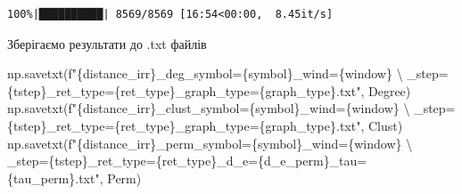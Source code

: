 \documentclass[
  letterpaper,
]{report}
\newenvironment{Shaded}{\begin{snugshade}}{\end{snugshade}}
\newcommand{\CharTok}[1]{\textcolor[rgb]{0.13,0.47,0.30}{#1}}
\newcommand{\NormalTok}[1]{\textcolor[rgb]{0.00,0.23,0.31}{#1}}
\newcommand{\SpecialCharTok}[1]{\textcolor[rgb]{0.37,0.37,0.37}{#1}}
\newcommand{\SpecialStringTok}[1]{\textcolor[rgb]{0.13,0.47,0.30}{#1}}
\begin{document}
\begin{verbatim}
100%|██████████| 8569/8569 [16:54<00:00,  8.45it/s]
\end{verbatim}

Зберігаємо результати до .txt файлів

\begin{Shaded}
\begin{Highlighting}[]
\NormalTok{np.savetxt(}\SpecialStringTok{f"}\SpecialCharTok{\{}\NormalTok{distance\_irr}\SpecialCharTok{\}}\SpecialStringTok{\_deg\_symbol=}\SpecialCharTok{\{}\NormalTok{symbol}\SpecialCharTok{\}}\SpecialStringTok{\_wind=}\SpecialCharTok{\{}\NormalTok{window}\SpecialCharTok{\}}\SpecialStringTok{ }\CharTok{\textbackslash{}}
\SpecialStringTok{            \_step=}\SpecialCharTok{\{}\NormalTok{tstep}\SpecialCharTok{\}}\SpecialStringTok{\_ret\_type=}\SpecialCharTok{\{}\NormalTok{ret\_type}\SpecialCharTok{\}}\SpecialStringTok{\_graph\_type=}\SpecialCharTok{\{}\NormalTok{graph\_type}\SpecialCharTok{\}}\SpecialStringTok{.txt"}\NormalTok{, Degree)}
\NormalTok{np.savetxt(}\SpecialStringTok{f"}\SpecialCharTok{\{}\NormalTok{distance\_irr}\SpecialCharTok{\}}\SpecialStringTok{\_clust\_symbol=}\SpecialCharTok{\{}\NormalTok{symbol}\SpecialCharTok{\}}\SpecialStringTok{\_wind=}\SpecialCharTok{\{}\NormalTok{window}\SpecialCharTok{\}}\SpecialStringTok{ }\CharTok{\textbackslash{}}
\SpecialStringTok{            \_step=}\SpecialCharTok{\{}\NormalTok{tstep}\SpecialCharTok{\}}\SpecialStringTok{\_ret\_type=}\SpecialCharTok{\{}\NormalTok{ret\_type}\SpecialCharTok{\}}\SpecialStringTok{\_graph\_type=}\SpecialCharTok{\{}\NormalTok{graph\_type}\SpecialCharTok{\}}\SpecialStringTok{.txt"}\NormalTok{, Clust)}
\NormalTok{np.savetxt(}\SpecialStringTok{f"}\SpecialCharTok{\{}\NormalTok{distance\_irr}\SpecialCharTok{\}}\SpecialStringTok{\_perm\_symbol=}\SpecialCharTok{\{}\NormalTok{symbol}\SpecialCharTok{\}}\SpecialStringTok{\_wind=}\SpecialCharTok{\{}\NormalTok{window}\SpecialCharTok{\}}\SpecialStringTok{ }\CharTok{\textbackslash{}}
\SpecialStringTok{            \_step=}\SpecialCharTok{\{}\NormalTok{tstep}\SpecialCharTok{\}}\SpecialStringTok{\_ret\_type=}\SpecialCharTok{\{}\NormalTok{ret\_type}\SpecialCharTok{\}}\SpecialStringTok{\_d\_e=}\SpecialCharTok{\{}\NormalTok{d\_e\_perm}\SpecialCharTok{\}}\SpecialStringTok{\_tau=}\SpecialCharTok{\{}\NormalTok{tau\_perm}\SpecialCharTok{\}}\SpecialStringTok{.txt"}\NormalTok{, Perm)}
\end{Highlighting}
\end{Shaded}
\end{document}
